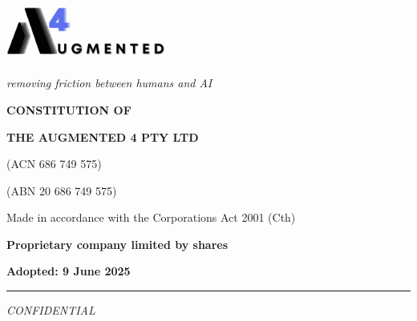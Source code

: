 \documentclass[12pt,a4paper]{article}
\begin{document}
\begin{titlepage}
    \centering
    \vspace*{1cm}
    
    \includegraphics[width=0.4\textwidth]{../images/email.jpg}
    \vspace{0.5cm}
    
    {\normalsize\itshape removing friction between humans and AI}
    \vspace{1.5cm}
    
    {\LARGE\textbf{CONSTITUTION OF}}
    \vspace{1cm}
    
    {\Large\textbf{THE AUGMENTED 4 PTY LTD}}
    \vspace{0.5cm}
    
    {\normalsize (ACN 686 749 575)}
    \vspace{0.2cm}
    
    {\normalsize (ABN 20 686 749 575)}
    \vspace{2cm}
    
    {\large Made in accordance with the Corporations Act 2001 (Cth)}
    \vspace{1cm}
    
    {\large\textbf{Proprietary company limited by shares}}
    \vspace{2cm}
    
    {\large\textbf{Adopted: 9 June 2025}}
    \vspace{1cm}
    
    \rule{0.5\textwidth}{0.5pt}
    
    \vspace{0.5cm}
    {\small\itshape CONFIDENTIAL}
\end{titlepage}

\newpage


\end{document}
